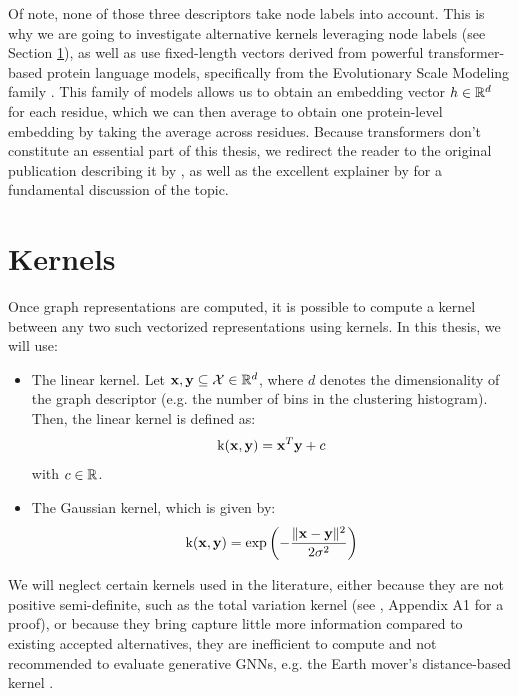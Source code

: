 Of note, none of those three descriptors take node labels into account. This is
why we are going to investigate alternative kernels leveraging node labels (see
Section \ref{sec:kernels}), as well as use fixed-length vectors derived from
powerful transformer-based protein language models, specifically from the
Evolutionary Scale Modeling family \citep{rives2021biological}. This family of
models allows us to obtain an embedding vector $h\in\mathbb{R}^d$ for each residue,
which we can then average to obtain one protein-level embedding by taking the
average across residues. Because transformers don't constitute an essential part
of this thesis, we redirect the reader to the original publication describing it
by \cite{vaswani2017attention}, as well as the excellent explainer by
\cite{alammar2018} for a fundamental discussion of the topic.

\section{Kernels}\label{sec:kernels}

Once graph representations are computed, it is possible to compute a kernel
between any two such vectorized representations using kernels. In this thesis,
we will use:

\begin{itemize}
\item The linear kernel. Let $\mathbf{x},\mathbf{y}\subseteq \mathcal{X}\in\mathbb{R}^d$, where $d$
  denotes the dimensionality of the graph descriptor (e.g. the number of bins in
  the clustering histogram). Then, the linear kernel is defined as:
  \begin{equation}
    \label{eq:linear_kernel}
    \text{k}(\mathbf{x}, \mathbf{y}) = \mathbf{x}^T \mathbf{y} + c
  \end{equation}
  with $c\in\mathbb{R}$.
\item The Gaussian kernel, which is given by:
  \begin{equation}
    \label{eq:gaussian_kernel}
    \text{k}(\mathbf{x}, \mathbf{y}) = \exp\left( -{\lVert \mathbf{x}-\mathbf{y} \rVert^2\over 2\sigma^2} \right)
  \end{equation}
\end{itemize}

We will neglect certain kernels used in the literature, either because they are not
positive semi-definite, such as the total variation kernel (see
\cite{o2021evaluation}, Appendix A1 for a proof), or because they bring capture
little more information compared to existing accepted alternatives, they are
inefficient to compute and not recommended to evaluate generative GNNs, e.g. the
Earth mover's distance-based kernel \citep{o2021evaluation}.

